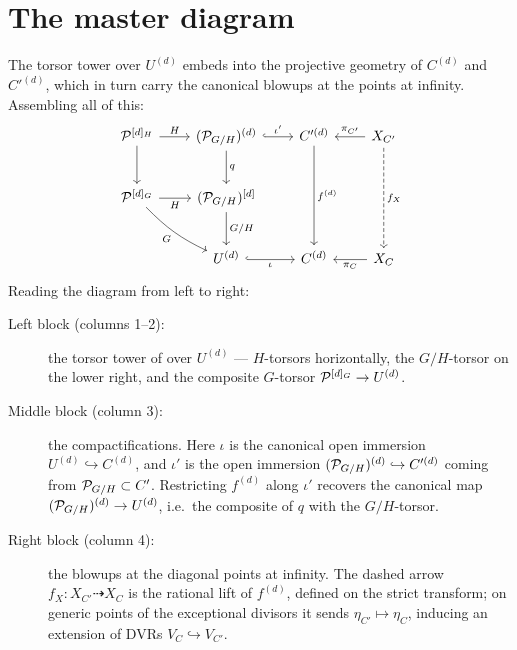 \documentclass[11pt]{article}
\begin{document}
\section{The master diagram}\label{sec:master}

The torsor tower over $U^{(d)}$ embeds into the projective geometry of $C^{(d)}$
and $C'^{(d)}$, which in turn carry the canonical blowups at the points at
infinity.  Assembling all of this:
\[
\begin{tikzcd}[row sep=2.4em, column sep=2.2em]
\cP^{[d]_H} \ar[r,"H"] \ar[d]
  & (\cP_{G/H})^{(d)} \ar[d,"q"] \ar[r,hookrightarrow,"\iota'"]
  & C'^{(d)} \ar[dd,"f^{(d)}"]
  & X_{C'} \ar[l,"\pi_{C'}"'] \ar[dd,dashed,"f_X"] \\
\cP^{[d]_G} \ar[r,"H"'] \ar[dr,"G"',bend right=10]
  & (\cP_{G/H})^{[d]} \ar[d,"G/H"]
  & & \\
  & U^{(d)} \ar[r,hookrightarrow,"\iota"']
  & C^{(d)}
  & X_C \ar[l,"\pi_C"]
\end{tikzcd}
\]
Reading the diagram from left to right:
\begin{description}
  \item[Left block (columns 1--2):] the torsor tower of
         over $U^{(d)}$ --- $H$-torsors
        horizontally, the $G/H$-torsor on the lower right, and the composite
        $G$-torsor $\mathcal{P}^{[d]_G} \to U^{(d)}$.
  \item[Middle block (column 3):] the compactifications.  Here $\iota$ is the
        canonical open immersion $U^{(d)} \hookrightarrow C^{(d)}$, and $\iota'$
        is the open immersion $(\mathcal{P}_{G/H})^{(d)} \hookrightarrow C'^{(d)}$
        coming from $\mathcal{P}_{G/H} \subset C'$.  Restricting $f^{(d)}$ along
        $\iota'$ recovers the canonical map $(\mathcal{P}_{G/H})^{(d)} \to U^{(d)}$,
        i.e.\ the composite of $q$ with the $G/H$-torsor.
  \item[Right block (column 4):] the blowups at the diagonal points at infinity.
        The dashed arrow $f_X \colon X_{C'} \dashrightarrow X_C$ is the rational
        lift of $f^{(d)}$, defined on the strict transform; on generic points of
        the exceptional divisors it sends $\eta_{C'} \mapsto \eta_C$, inducing
        an extension of DVRs $V_C \hookrightarrow V_{C'}$.
\end{description}

\end{document}
